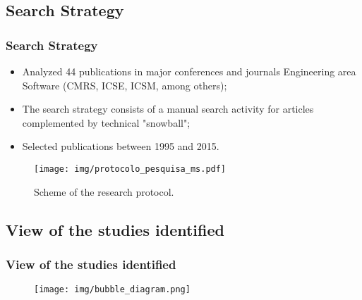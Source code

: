 \documentclass{beamer}
\begin{document}



\subsection{Search Strategy}


\begin{frame}
  \frametitle{Search Strategy}

  	\begin{itemize}
	    \item<1->Analyzed 44 publications in major
				conferences and journals Engineering area
				Software (CMRS, ICSE, ICSM, among others);
	    \item<2->The search strategy consists of a manual search 
	    			activity for articles complemented 
	    			by technical "snowball";
		\item<3->Selected publications between 1995 and 2015.
	\end{itemize}
  
  	
	\begin{figure}
	\centering
		\texttt{[image: img/protocolo\_pesquisa\_ms.pdf]}
		\caption{Scheme of the research protocol.}
	\end{figure}
  
\end{frame}








\subsection{View of the studies identified}


\begin{frame}
  \frametitle{View of the studies identified}

  	
	\begin{figure}
	\centering
		\texttt{[image: img/bubble\_diagram.png]}
	\end{figure}
  
\end{frame}
\end{document}
